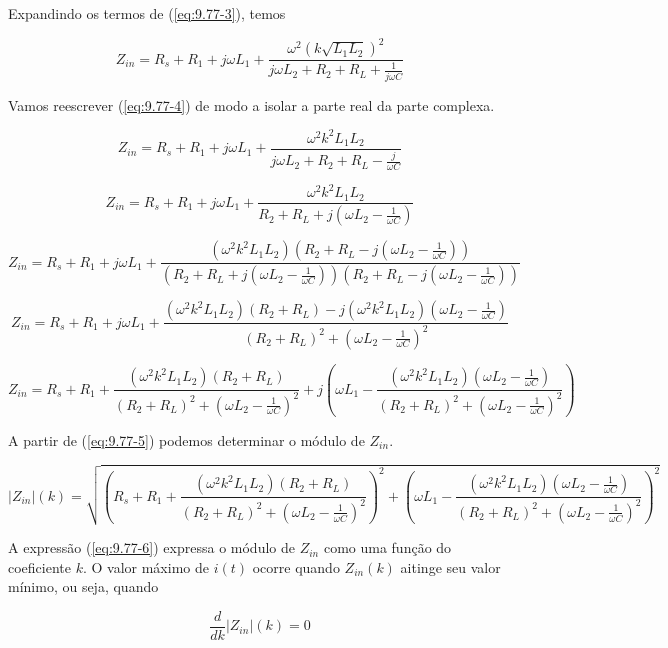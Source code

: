 Expandindo os termos de (\ref{eq:9.77-3}), temos

\begin{equation}\label{eq:9.77-4}\tag{9.77-4}
    Z_{in} = R_s + R_1 + j \omega L_1 + \frac{\omega^2(k\sqrt{L_1L_2})^2}{j\omega L_2 + R_2 + R_L + \frac{1}{j\omega C}}
\end{equation}

Vamos reescrever (\ref{eq:9.77-4}) de modo a isolar a parte real da parte complexa.

\[ Z_{in} = R_s + R_1 + j \omega L_1 + \frac{\omega^2k^2L_1L_2}{j\omega L_2 + R_2 + R_L - \frac{j}{\omega C}} \]

\[ Z_{in} = R_s + R_1 + j \omega L_1 + \frac{\omega^2k^2L_1L_2}{R_2 + R_L + j(\omega L_2 - \frac{1}{\omega C})} \]

\[ Z_{in} = R_s + R_1 + j \omega L_1 + \frac{(\omega^2k^2L_1L_2)(R_2 + R_L - j(\omega L_2 - \frac{1}{\omega C}))}{(R_2 + R_L + j(\omega L_2 - \frac{1}{\omega C}))(R_2 + R_L - j(\omega L_2 - \frac{1}{\omega C}))} \]

\[ Z_{in} = R_s + R_1 + j \omega L_1 + \frac{(\omega^2k^2L_1L_2)(R_2 + R_L) - j(\omega^2k^2L_1L_2)(\omega L_2 - \frac{1}{\omega C})}{(R_2 + R_L)^2 + (\omega L_2 - \frac{1}{\omega C})^2} \]

\begin{equation}\label{eq:9.77-5}\tag{9.77-5}
    Z_{in} = R_s + R_1 + \frac{(\omega^2k^2L_1L_2)(R_2 + R_L)}{(R_2 + R_L)^2 + (\omega L_2 - \frac{1}{\omega C})^2} + j \left(\omega L_1 - \frac{(\omega^2k^2L_1L_2)(\omega L_2 - \frac{1}{\omega C})}{(R_2 + R_L)^2 + (\omega L_2 - \frac{1}{\omega C})^2}\right)
\end{equation}

A partir de (\ref{eq:9.77-5}) podemos determinar o módulo de \(Z_{in}\).

\begin{equation}\label{eq:9.77-6}\tag{9.77-6}
    |Z_{in}|(k) = \sqrt{\left(R_s + R_1 + \frac{(\omega^2k^2L_1L_2)(R_2 + R_L)}{(R_2 + R_L)^2 + (\omega L_2 - \frac{1}{\omega C})^2}\right)^2 + \left(\omega L_1 - \frac{(\omega^2k^2L_1L_2)(\omega L_2 - \frac{1}{\omega C})}{(R_2 + R_L)^2 + (\omega L_2 - \frac{1}{\omega C})^2}\right)^2}
\end{equation}

A expressão (\ref{eq:9.77-6}) expressa o módulo de \(Z_{in}\) como uma função do coeficiente \(k\). O valor máximo de \(i(t)\) ocorre quando \(Z_{in}(k)\) aitinge seu valor mínimo, ou seja, quando

\begin{equation}\label{eq:9.77-7}\tag{9.77-7}
    \frac{d}{dk}|Z_{in}|(k) = 0
\end{equation}

